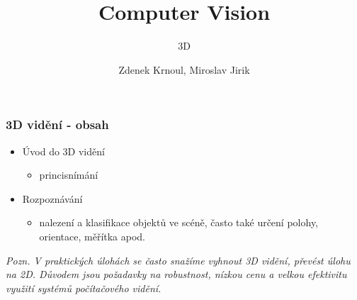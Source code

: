 \title{Computer Vision}
\subtitle{3D}
\author{Zdenek Krnoul, Miroslav Jirik}

\date{} %



\begingroup 
{}

\begin{frame}
	\titlepage
\end{frame}

\addtocounter{framenumber}{-1}
\expandafter\def\expandafter\insertshorttitle\expandafter{%
	\insertshorttitle \hfill \insertframenumber\,/\,\inserttotalframenumber
}


\begin{frame}
\frametitle{3D vidění - obsah}
\begin{itemize}
	\item Úvod do 3D vidění
    \begin{itemize}
        \item princisnímání
    \end{itemize}
    \item Rozpoznávání
    \begin{itemize}
    \item nalezení a klasifikace objektů ve scéně, často také určení polohy, orientace, měřítka apod.
    \end{itemize}
\end{itemize}
\textit{Pozn. V praktických úlohách se často snažíme vyhnout 3D vidění, převést úlohu na 2D. Důvodem jsou požadavky na robustnost, nízkou cenu a velkou efektivitu využití systémů počítačového vidění.}
\end{frame}

